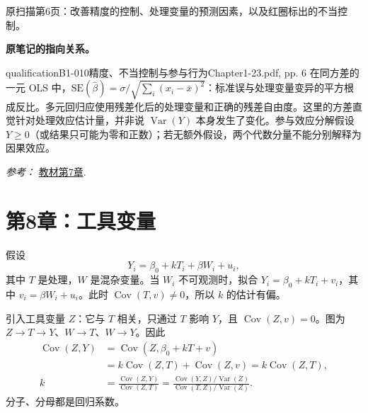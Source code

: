 {\begin{center}
\begin{tikzpicture}[>=Stealth, font=\small, line width=.65pt]
\end{tikzpicture}
\par{\small 原扫描第6页：改善精度的控制、处理变量的预测因素，以及红圈标出的不当控制。}
\end{center}
\par{}\smallskip\textbf{原笔记的指向关系。}\par\smallskip
{}
\begin{reviewnote}{qualification}{B1-010}{精度、不当控制与参与行为}{Chapter1-23.pdf, pp. 6}
在同方差的一元 OLS 中，$\mathrm{SE}(\hat\beta)=\sigma/\sqrt{\sum_i(x_i-\bar x)^2}$：标准误与处理变量变异的平方根成反比。多元回归应使用残差化后的处理变量和正确的残差自由度。这里的方差直觉针对处理效应估计量，并非说 $\operatorname{Var}(Y)$ 本身发生了变化。参与效应分解假设 $Y\ge0$（或结果只可能为零和正数）；若无额外假设，两个代数分量不能分别解释为因果效应。
\par\smallskip\textit{参考：} \href{https://matheusfacure.github.io/python-causality-handbook/07-Beyond-Confounders.html}{教材第7章}.
\end{reviewnote}
\section{第8章：工具变量}
假设
\[Y_i=\beta_0+kT_i+\beta W_i+u_i,\]
其中 $T$ 是处理，$W$ 是混杂变量。当 $W_i$ 不可观测时，拟合 $Y_i=\beta_0+kT_i+v_i$，其中 $v_i=\beta W_i+u_i$。此时 $\operatorname{Cov}(T,v)\ne0$，所以 $k$ 的估计有偏。

引入工具变量 $Z$：它与 $T$ 相关，只通过 $T$ 影响 $Y$，且 $\operatorname{Cov}(Z,v)=0$。图为 $Z\to T\to Y$、$W\to T$、$W\to Y$。因此
\begin{align*}
\operatorname{Cov}(Z,Y)&=\operatorname{Cov}(Z,\beta_0+kT+v)\\
&=k\operatorname{Cov}(Z,T)+\operatorname{Cov}(Z,v)=k\operatorname{Cov}(Z,T),\\
k&=\frac{\operatorname{Cov}(Z,Y)}{\operatorname{Cov}(Z,T)}
=\frac{\operatorname{Cov}(Y,Z)/\operatorname{Var}(Z)}{\operatorname{Cov}(T,Z)/\operatorname{Var}(Z)}.
\end{align*}
分子、分母都是回归系数。

}

